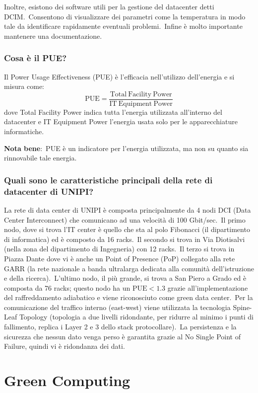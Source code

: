 \documentclass[12pt, a4paper]{article}
\begin{document}
\noindent Inoltre, esistono dei software utili per la gestione del datacenter detti DCIM.\
Consentono di visualizzare dei parametri come la temperatura in modo tale da identificare rapidamente eventuali problemi.\
Infine è molto importante mantenere una documentazione.

\subsubsection*{Cosa è il PUE?}
Il Power Usage Effectiveness (PUE) è l'efficacia nell'utilizzo dell'energia e si misura come:
\[\mathrm{PUE = \frac{Total\ Facility\ Power}{IT\ Equipment\ Power}}\]
\noindent dove Total Facility Power indica tutta l'energia utilizzata all'interno del datacenter e IT Equipment Power l'energia usata solo per le apparecchiature informatiche.

\textbf{Nota bene}:\ PUE è un indicatore per l'energia utilizzata, ma non su quanto sia rinnovabile tale energia.

\subsubsection*{Quali sono le caratteristiche principali della rete di datacenter di UNIPI?}

La rete di data center di UNIPI è composta principalmente da 4 nodi DCI (Data Center Interconnect) che comunicano ad una velocità di 100 Gbit/sec.\ Il primo nodo, dove si trova l'IT center è quello che sta al polo Fibonacci (il dipartimento di informatica) ed è composto da 16 racks.\
Il secondo si trova in Via Diotisalvi (nella zona del dipartimento di Ingegneria) con 12 racks.\
Il terzo si trova in Piazza Dante dove vi è anche un Point of Presence (PoP) collegato alla rete GARR (la rete nazionale a banda ultralarga dedicata alla comunità dell'istruzione e della ricerca).\
L'ultimo nodo, il più grande, si trova a San Piero a Grado ed è composta da 76 racks; questo nodo ha un $\mathrm{PUE}<1.3$ grazie all'implementazione del raffreddamento adiabatico e viene riconosciuto come green data center.\
Per la comunicazione del traffico interno (east-west) viene utilizzata la tecnologia Spine-Leaf Topology (topologia a due livelli ridondante, per ridurre al minimo i punti di fallimento, replica i Layer 2 e 3 dello
stack protocollare).\
La persistenza e la sicurezza che nessun dato venga perso è garantita grazie al No Single Point of Failure, quindi vi è ridondanza dei dati.

\section{Green Computing}
\end{document}
